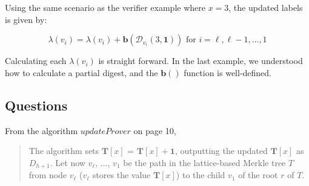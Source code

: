 \documentclass[11pt, letterpaper, oneside]{article}
\begin{document}
Using the same scenario as the verifier example where $x = 3$, the updated labels is given by:

\begin{equation}
\lambda(v_{i}) = \lambda(v_{i}) + \textbf{b}( \mathcal{D}_{v_{i}}(3, \textbf{1}) ) \textrm{ for } i = \ell, \ell -1, \ldots, 1  
\end{equation}

Calculating each $\lambda(v_{i})$ is straight forward.  In the last example, we understood how to calculate a partial digest, and the $\textbf{b}()$ function is well-defined.

\subsection{Questions}

From the algorithm $updateProver$ on page 10, 

\begin{quote}
The algorithm sets $\textbf{T}[x]$ = $\textbf{T}[x] + \textbf{1}$, outputting the updated $\textbf{T}[x]$ as $D_{h + 1}$. Let now
$v_{\ell}$, $\ldots$, $v_{1}$ be the path in the lattice-based Merkle tree $T$ from node $v_{\ell}$ ($v_{\ell}$ stores the value  $\textbf{T}[x]$) to the child $v_{1}$ of the root $r$ of $T$.
\end{quote}
\end{document}
